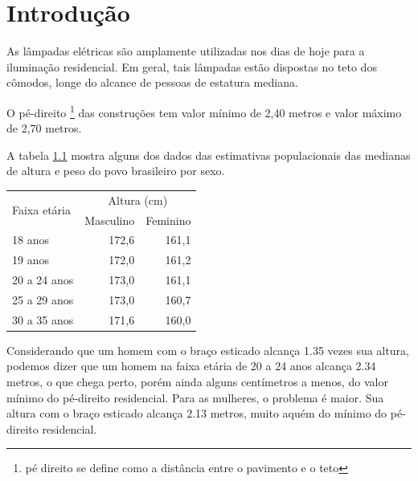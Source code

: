 \chapter{Introdução}
\label{chap:intro}

As lâmpadas elétricas são amplamente utilizadas nos dias
de hoje para a iluminação residencial.
Em geral, tais lâmpadas estão dispostas no teto dos cômodos,
longe do alcance de pessoas de estatura mediana.

O pé-direito 
\footnote{pé direito se define como a distância entre o pavimento e o teto}
das construções tem valor mínimo de 2,40 metros e valor máximo de 2,70 metros.

A tabela \ref{tab:ibge} mostra alguns dos dados das estimativas populacionais das
medianas de altura e peso do povo brasileiro por sexo.

\begin{table}[!htb]
  	\centering
  	\begin{tabular}{|l|r|r|}
  	\hline
    \multirow{2}{*}{Faixa etária} & \multicolumn{2}{|c|}{Altura (cm)} \\ \cline{2-3}
                 & Masculino & Feminino \\ \hline
    18      anos & 172,6 & 161,1 \\
    19      anos & 172,0 & 161,2 \\
    20 a 24 anos & 173,0 & 161,1 \\
    25 a 29 anos & 173,0 & 160,7 \\
    30 a 35 anos & 171,6 & 160,0 \\
    \hline
    \end{tabular}
    \label{tab:ibge}
\end{table}

Considerando que um homem com o braço esticado alcança 1.35 vezes sua altura,
podemos dizer que um homem na faixa etária de 20 a 24 anos alcança 2.34 metros,
o que chega perto, porém ainda alguns centímetros a menos, do valor mínimo do
pé-direito residencial.
Para as mulheres, o problema é maior. Sua altura com o braço esticado alcança
2.13 metros, muito aquém do mínimo do pé-direito residencial.

